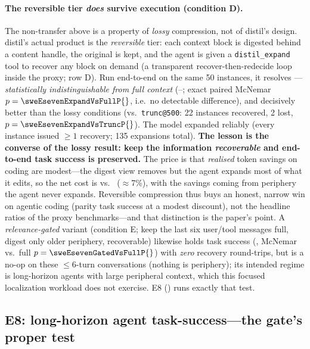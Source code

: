 \documentclass[11pt]{article}
\newcommand{\sweEsevenN}{50}\newcommand{\sweEsevenSeed}{1729}%
\newcommand{\sweEsevenFullPass}{--}\newcommand{\sweEsevenFullResolved}{--}%
\begin{document}
\paragraph{The reversible tier \emph{does} survive execution (condition D).} The
non-transfer above is a property of \emph{lossy} compression, not of distil's design.
distil's actual product is the \emph{reversible} tier: each context block is digested
behind a content handle, the original is kept, and the agent is given a
\texttt{distil\_expand} tool to recover any block on demand (a transparent
recover-then-redecide loop inside the proxy;  row D). Run end-to-end on the
same \sweEsevenN{} instances, it resolves \textbf{\sweEsevenExpandPass}---\emph{statistically
indistinguishable from full context} (\sweEsevenFullPass{}; exact paired McNemar
$p=\sweEsevenExpandVsFullP{}$, i.e.\ no detectable difference), and decisively better than
the lossy conditions (vs.\ \texttt{trunc@500}: 22 instances recovered, 2 lost,
$p=\sweEsevenExpandVsTruncP{}$). The model expanded reliably (every instance issued
$\ge 1$ recovery; 135 expansions total). \textbf{The lesson is the converse of the
lossy result: keep the information \emph{recoverable} and end-to-end task success is
preserved.} The price is that \emph{realised} token savings on coding are modest---the
digest view removes \sweEsevenExpandCtxRed{} but the agent expands most of what it edits,
so the net cost is \sweEsevenExpandCost{} vs.\ \sweEsevenFullCost{} ($\approx$7\%), with
the savings coming from periphery the agent never expands. Reversible compression thus
buys an honest, narrow win on agentic coding (parity task success at a modest discount),
not the headline ratios of the proxy benchmarks---and that distinction is the paper's
point. A \emph{relevance-gated} variant (condition E; keep the last six user/tool
messages full, digest only older periphery, recoverable) likewise holds task success
(\sweEsevenGatedPass{}, McNemar vs.\ full $p=\sweEsevenGatedVsFullP{}$) with \emph{zero}
recovery round-trips, but is a no-op on these $\le$6-turn conversations (nothing is
periphery); its intended regime is long-horizon agents with large peripheral context,
which this focused localization workload does not exercise. E8 () runs
exactly that test.

\subsection{E8: long-horizon agent task-success---the gate's proper test}
\label{sec:e8}
\end{document}
